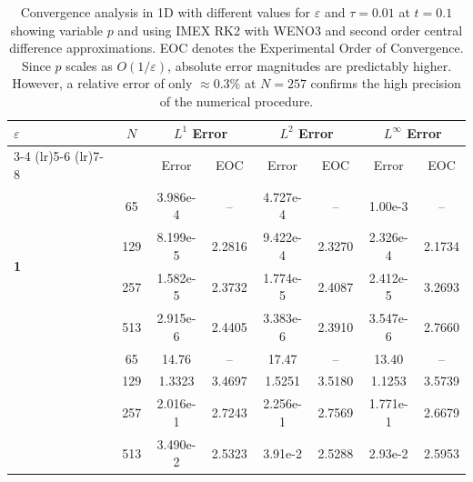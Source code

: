 \documentclass[final,11pt]{siamart251216}
\numberwithin{equation}{section}
\theoremstyle{definition}
\theoremstyle{remark}
\begin{document}
\begin{table}[htbp]
    \centering
    \small
    \begin{tabular}{@{} l c cc cc cc @{}}
        \toprule
        \multirow{2}{*}{\textbf{$\varepsilon$}} & \multirow{2}{*}{$N$} & \multicolumn{2}{c}{\textbf{$L^1$ Error}} & \multicolumn{2}{c}{\textbf{$L^2$ Error}} & \multicolumn{2}{c}{\textbf{$L^\infty$ Error}} \\
        \cmidrule(lr){3-4} \cmidrule(lr){5-6} \cmidrule(lr){7-8}
        & & Error & EOC & Error & EOC & Error & EOC \\
        \midrule
        \multirow{4}{*}{\textbf{1}} 
		& 65  & 3.986e-4 & -- & 4.727e-4 & -- & 1.00e-3 & -- \\
       & 129  & 8.199e-5 & 2.2816 & 9.422e-4 & 2.3270 & 2.326e-4 & 2.1734 \\
        & 257  & 1.582e-5 & 2.3732 & 1.774e-5 & 2.4087 & 2.412e-5 & 3.2693 \\
        & 513  & 2.915e-6 & 2.4405 & 3.383e-6 & 2.3910 & 3.547e-6 & 2.7660 \\
        \addlinespace[0.3cm]
        \multirow{4}{*}{\textbf{0.01}} 
		& 65  & 14.76 & -- & 17.47 & -- & 13.40 & -- \\
       & 129  & 1.3323 & 3.4697 & 1.5251 & 3.5180 & 1.1253 & 3.5739 \\
        & 257  & 2.016e-1 & 2.7243 & 2.256e-1 & 2.7569 & 1.771e-1 & 2.6679 \\
        & 513  & 3.490e-2 & 2.5323 & 3.91e-2 & 2.5288 & 2.93e-2 & 2.5953 \\
 \bottomrule
    \end{tabular}
    \caption{Convergence analysis in 1D with different values for $\varepsilon$ and $\tau = 0.01$ at $t = 0.1$ showing variable $p$ and using IMEX RK2 with WENO3 and second order central difference approximations. EOC denotes the Experimental Order of Convergence. Since $p$ scales as $O(1/\varepsilon)$, absolute error magnitudes are predictably higher. However, a relative error of only $\approx 0.3 \%$ at $N=257$ confirms the high precision of the numerical procedure.}
    \label{tab:convergence_1Dptau0dot01}
\end{table}
\end{document}
